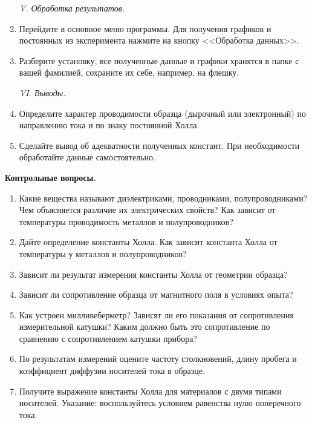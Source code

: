 \documentclass[a4paper,12pt]{article} %
\begin{document}
\begin{enumerate}
\begin{center}
\textit{V. Обработка результатов.}
\end{center}  

\item Перейдите в основное меню программы. Для получения графиков и постоянных из эксперимента нажмите на кнопку  <<Обработка данных>>. 
\item Разберите установку, все полученные данные и графики хранятся в папке с вашей фамилией, сохраните их себе, например, на флешку.

\begin{center}
\textit{VI. Выводы.}
\end{center}  
\item Определите характер проводимости образца (дырочный или электронный) по направлению тока и по знаку постоянной Холла.

\item Сделайте вывод об адекватности полученных констант. При необходимости обработайте данные самостоятельно.
\end{enumerate}


\begin{center}
\textsf{\textbf{Контрольные вопросы.}}
\end{center}  

\begin{enumerate}

\item Какие вещества называют диэлектриками, проводниками, полупроводниками? Чем объясняется различие их электрических свойств? Как зависит
от температуры проводимость металлов и полупроводников?
\item Дайте определение константы Холла. Как зависит константа Холла от температуры у металлов и полупроводников?
\item Зависит ли результат измерения константы Холла от геометрии образца?
\item Зависит ли сопротивление образца от магнитного поля в условиях опыта?
\item Как устроен милливеберметр? Зависят ли его показания от сопротивления измерительной катушки? Каким должно быть это сопротивление по
сравнению с сопротивлением катушки прибора?
\item По результатам измерений оцените частоту столкновений, длину пробега
и коэффициент диффузии носителей тока в образце.
\item Получите выражение константы Холла для материалов с двумя типами носителей. Указание: воспользуйтесь условием равенства нулю поперечного
тока.
  
\end{enumerate}
\end{document}
